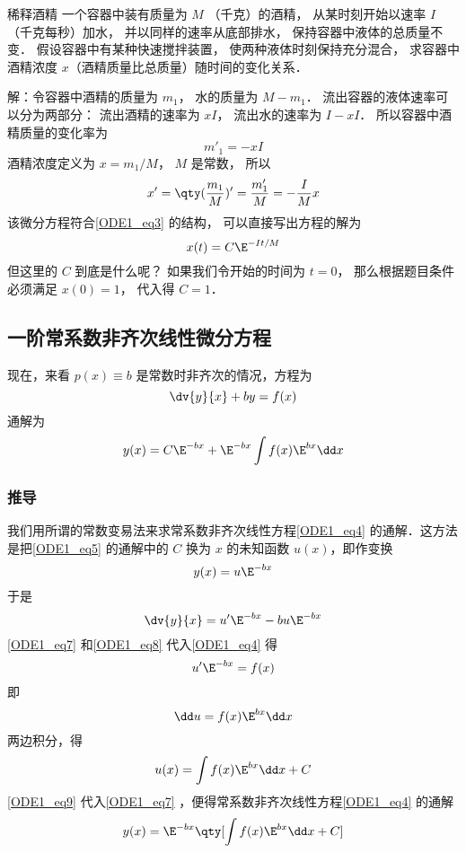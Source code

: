 \begin{example}{稀释酒精}
一个容器中装有质量为 $M$ （千克）的酒精， 从某时刻开始以速率 $I$ （千克每秒）加水， 并以同样的速率从底部排水， 保持容器中液体的总质量不变． 假设容器中有某种快速搅拌装置， 使两种液体时刻保持充分混合， 求容器中酒精浓度 $x$（酒精质量比总质量）随时间的变化关系．

解：令容器中酒精的质量为 $m_1$， 水的质量为 $M - m_1$． 流出容器的液体速率可以分为两部分： 流出酒精的速率为 $xI$， 流出水的速率为 $I - xI$． 所以容器中酒精质量的变化率为
\begin{equation}
m'_1 = -xI
\end{equation}
酒精浓度定义为 $x = m_1/M$， $M$ 是常数， 所以
\begin{equation}
x' = \qty(\frac{m_1}{M})' = \frac{m'_1}{M} = -\frac{I}{M}x
\end{equation}
该微分方程符合\autoref{ODE1_eq3} 的结构， 可以直接写出方程的解为
\begin{equation}
x(t) = C\E^{-It/M}
\end{equation}
但这里的 $C$ 到底是什么呢？ 如果我们令开始的时间为 $t = 0$， 那么根据题目条件必须满足 $x(0) = 1$， 代入得 $C = 1$．
\end{example}

\subsection{一阶常系数非齐次线性微分方程}
现在，来看 $p(x) \equiv b$ 是常数时非齐次的情况，方程为
\begin{equation}\label{ODE1_eq4}
\dv{y}{x} + by = f(x)
\end{equation}
通解为
\begin{equation}\label{ODE1_eq13}
y(x)=C\E^{-bx}+\E^{-bx}\int f(x)\E^{bx}\dd x
\end{equation}

\subsubsection{推导}
我们用所谓的常数变易法来求常系数非齐次线性方程\autoref{ODE1_eq4} 的通解．这方法是把\autoref{ODE1_eq5} 的通解中的 $C$ 换为 $x$ 的未知函数 $u(x)$，即作变换
\begin{equation}\label{ODE1_eq7}
y(x)=u\E^{-bx}
\end{equation}
于是
\begin{equation}\label{ODE1_eq8}
\dv{y}{x}=u'\E^{-bx}-bu\E^{-bx}
\end{equation}
\autoref{ODE1_eq7} 和\autoref{ODE1_eq8} 代入\autoref{ODE1_eq4} 得
\begin{equation}
u'\E^{-bx}=f(x)
\end{equation}
即
\begin{equation}
\dd u=f(x)\E^{bx}\dd x
\end{equation}
两边积分，得
\begin{equation}\label{ODE1_eq9}
u(x)=\int f(x)\E^{bx}\dd x+C
\end{equation}
\autoref{ODE1_eq9} 代入\autoref{ODE1_eq7} ，便得常系数非齐次线性方程\autoref{ODE1_eq4} 的通解
\begin{equation}\label{ODE1_eq12}
y(x)=\E^{-bx}\qty[\int f(x)\E^{bx}\dd x+C]
\end{equation}

